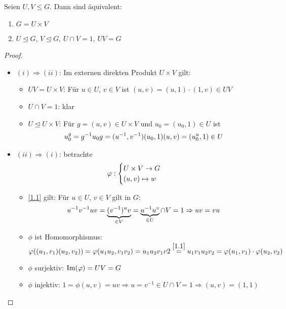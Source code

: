 \begin{proposition}
	Seien $U,V\le G$. Dann sind äquivalent:
	\begin{enumerate}[label=(\roman*)]
		\item $G=U\times V$
		\item $U\unlhd G$, $V\unlhd G$, $U\cap V=1$, $UV=G$
	\end{enumerate}
\end{proposition}
\begin{proof}
	\begin{itemize}
		\item $(i)\Rightarrow (ii)$: Im externen direkten Produkt $U\times V$ gilt:
		\begin{itemize}
			\item $UV=U\times V$: Für $u\in U$, $v\in V$ ist $(u,v)=(u,1)\cdot (1,v)\in UV$
			\item $U\cap V=1$: klar
			\item $U\unlhd U\times V$: Für $g=(u,v)\in U\times V$ und $u_0=(u_0,1)\in U$ ist 
			\begin{align}
				u_0^g = g^{-1}u_0g=(u^{-1},v^{-1})(u_0,1)(u,v)=(u_0^u,1)\in U\notag
			\end{align}
		\end{itemize}
		\item $(ii)\Rightarrow (i)$: betrachte 
		\begin{align}
			\phi: \begin{cases}
			U\times V\to G \\ (u,v)\mapsto w
			\end{cases}\notag
		\end{align}
		\begin{itemize}
			\item \cref{1.1} gilt: Für $u\in U$, $v\in V$ gilt in $G$:
			\begin{align}
				u^{-1}v^{-1}uv=\underbrace{(v^{-1})^uv}_{\in V} = \underbrace{u^{-1}u^v}_{\in U}\cap V=1\Rightarrow uv=vu\notag
			\end{align}
			\item $\phi$ ist Homomorphismus: $\phi((u_1,v_1)(u_2,v_2)) = \phi(u_1u_2,v_1v_2) = u_1u_2v_1v2 \overset{\eqref{1.1}}{=} u_1v_1u_2v_2 = \phi(u_1,v_1)\cdot \phi(u_2,v_2)$
			\item $\phi$ surjektiv: $\Image(\phi)=UV=G$
			\item $\phi$ injektiv: $1=\phi(u,v) = uv\Rightarrow u=v^{-1}\in U\cap V = 1\Rightarrow (u,v) = (1,1)$
		\end{itemize}
	\end{itemize}
\end{proof}


